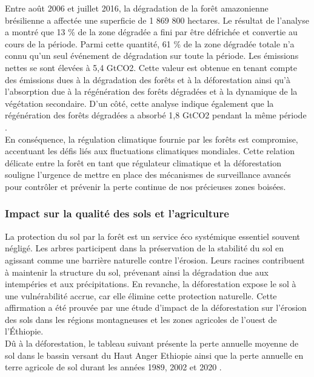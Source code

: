 Entre août 2006 et juillet 2016, la dégradation de la forêt amazonienne brésilienne a affectée une superficie de 1 869 800 hectares. Le résultat de l’analyse a montré que 13 \% de la zone dégradée a fini par être défrichée et convertie au cours de la période. Parmi cette quantité, 61 \% de la zone dégradée totale n'a connu qu'un seul événement de dégradation sur toute la période. Les émissions nettes se sont élevées à 5,4 GtCO2. Cette valeur est obtenue en tenant compte des émissions dues à la dégradation des forêts et à la déforestation ainsi qu’à l'absorption due à la régénération des forêts dégradées et à la dynamique de la végétation secondaire. D’un côté, cette analyse indique également que la régénération des forêts dégradées a absorbé 1,8 GtCO2 pendant la même période \cite{10}.
\\

En conséquence, la régulation climatique fournie par les forêts est compromise, accentuant les défis liés aux fluctuations climatiques mondiales. Cette relation délicate entre la forêt en tant que régulateur climatique et la déforestation souligne l'urgence de mettre en place des mécanismes de surveillance avancés pour contrôler et prévenir la perte continue de nos précieuses zones boisées.
\\

\subsubsection{Impact sur la qualité des sols et l’agriculture}
La protection du sol par la forêt est un service éco systémique essentiel souvent négligé. Les arbres participent dans la préservation de la stabilité du sol en agissant comme une barrière naturelle contre l'érosion. Leurs racines contribuent à maintenir la structure du sol, prévenant ainsi la dégradation due aux intempéries et aux précipitations. En revanche, la déforestation expose le sol à une vulnérabilité accrue, car elle élimine cette protection naturelle. Cette affirmation a été prouvée par une étude d’impact de la déforestation sur l'érosion des sols dans les régions montagneuses et les zones agricoles de l'ouest de l'Éthiopie.
\\

Dû à la déforestation, le tableau suivant présente la perte annuelle moyenne de sol dans le bassin versant du Haut Anger Ethiopie ainsi que la perte annuelle en terre agricole de sol durant les années 1989, 2002 et 2020 \cite{11}. 
\\

